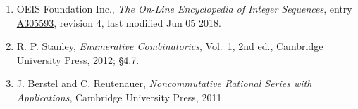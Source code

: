 \documentclass[11pt]{article}
\theoremstyle{definition}
\begin{document}
\begin{enumerate}

\item OEIS Foundation Inc., \emph{The On-Line Encyclopedia of Integer Sequences}, entry \href{https://oeis.org/A305593}{A305593}, revision 4, last modified Jun 05 2018.

\item R. P. Stanley, \emph{Enumerative Combinatorics}, Vol.~1, 2nd ed., Cambridge University Press, 2012; \S4.7.

\item J. Berstel and C. Reutenauer, \emph{Noncommutative Rational Series with Applications}, Cambridge University Press, 2011.

\end{enumerate}
\end{document}

